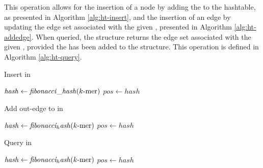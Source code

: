 This operation allows for the insertion of a node by adding the \kmer to the hashtable, as presented in Algorithm \ref{alg:ht-insert},
and the insertion of an edge by updating the edge set associated with the given \kmer, presented in Algorithm \ref{alg:ht-addedge}.
When queried, the structure returns the edge set associated with the given \kmer, provided the \kmer has been added to the structure.
This operation is defined in Algorithm \ref{alg:ht-query}.

\begin{algorithm}
  \caption{Insert \kmer in \dBHT}\label{alg:ht-insert}
  \KwData{$\kmer$}
  $\mathit{hash} \gets \mathit{fibonacci\_hash}(\mbox{$k$-mer})$\;
  $\mathit{pos} \gets \mathit{hash}$\;
\end{algorithm}

\begin{algorithm}
  \caption{Add out-edge to \kmer in \dBHT}\label{alg:ht-addedge}
  $\mathit{hash} \gets \mathit{fibonacci_hash}(\mbox{$k$-mer})$\;
  $\mathit{pos} \gets \mathit{hash}$\;
\end{algorithm}

\begin{algorithm}
  \caption{Query \kmer in \dBHT}\label{alg:ht-query}
  $\mathit{hash} \gets \mathit{fibonacci_hash}(\mbox{$k$-mer})$\;
  $\mathit{pos} \gets \mathit{hash}$\;
\end{algorithm}


